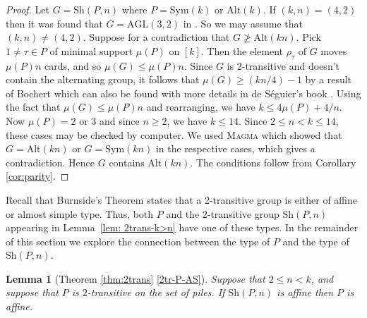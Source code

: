 \documentclass[12pt]{amsart}
\newtheorem{lem}[thm]{Lemma}
\theoremstyle{remark}
\theoremstyle{definition}
\newcommand{\sym}{\mathrm{Sym}}
\newcommand{\alt}{\mathrm{Alt}}
\newcommand{\sh}{\mathrm{Sh}}
\newcommand{\AGL}{\mathrm{AGL}}
\begin{document}
\begin{proof}
Let $G = \sh(P,n)$ where $P = \sym(k)$ or $\alt(k)$. If $(k,n)=(4,2)$ then it was found that $G=\AGL(3,2)$ in \cite[Table 2]{MM}. 
So we may assume that $(k,n) \neq (4,2)$. Suppose for a contradiction that $G \ngeqslant \alt(kn)$. Pick $1 \neq \tau \in P$ of minimal support $\mu(P)$ on $[k]$. Then the element $\rho_\tau$ of $G$ moves $\mu(P)n$ cards, and so
$\mu(G) \leqslant \mu(P)n$.
 Since $G$ is 2-transitive and doesn't contain the alternating group, it follows that $\mu(G) \geqslant (kn/4) - 1$ by a result of Bochert \cite{bochert} which can also be found with more details in de S\'eguier's book \cite[pp. 52--54]{deS}. Using the fact that $\mu(G) \leqslant \mu(P)n$ and rearranging, we have $k \leqslant 4\mu(P) + 4/n$. Now $\mu(P)=2$ or $3$ and since $n \geqslant 2$, we have $k \leqslant 14$. Since $2 \leqslant n < k \leqslant 14$, these cases may be checked by computer. We used \textsc{Magma} \cite{magma} which showed that $G = \alt(kn)$ or $G = \sym(kn)$ in the respective cases, which gives a contradiction. Hence $G$ contains $\alt(kn)$.  The conditions follow from Corollary \ref{cor:parity}.
\end{proof}

Recall that Burnside's Theorem states that a 2-transitive group is either of affine or almost simple type. Thus, both $P$ and the 2-transitive group $\sh(P,n)$ appearing in Lemma~\ref{lem: 2trans-k>n} have one of these types. In the remainder of this section we explore the connection between the type of $P$ and the type of $\sh(P,n)$. 

\begin{lem}[Theorem \ref{thm:2trans} \eqref{2tr-P-AS}] \label{lem:2trans-aff}
Suppose that $2 \leqslant n < k$, and suppose that $P$ is $2$-transitive on the set of piles. If $\sh(P,n)$ is affine then $P$ is affine.
\end{lem}
\end{document}

